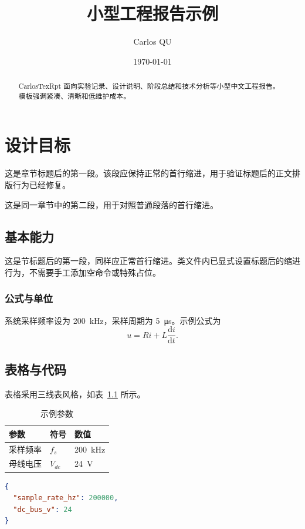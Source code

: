 \documentclass{CarlosTexRpt}
\title{小型工程报告示例}
\author{Carlos QU}
\date{\today}
\begin{document}
\maketitle

\begin{abstract}
CarlosTexRpt 面向实验记录、设计说明、阶段总结和技术分析等小型中文工程报告。模板强调紧凑、清晰和低维护成本。
\end{abstract}

\tableofcontents

\chapter{设计目标}
这是章节标题后的第一段。该段应保持正常的首行缩进，用于验证标题后的正文排版行为已经修复。

这是同一章节中的第二段，用于对照普通段落的首行缩进。

\section{基本能力}
这是节标题后的第一段，同样应正常首行缩进。类文件内已显式设置标题后的缩进行为，不需要手工添加空命令或特殊占位。

\subsection{公式与单位}
系统采样频率设为 \SI{200}{\kilo\hertz}，采样周期为 \SI{5}{\micro\second}。示例公式为
\begin{equation}
  u = Ri + L\frac{\mathrm{d}i}{\mathrm{d}t}.
\end{equation}

\section{表格与代码}
表格采用三线表风格，如表~\ref{tab:params} 所示。

\begin{table}[H]
  \centering
  \caption{示例参数}
  \label{tab:params}
  \begin{tabular}{lll}
    \toprule
    参数 & 符号 & 数值 \\
    \midrule
    采样频率 & $f_s$ & \SI{200}{\kilo\hertz} \\
    母线电压 & $V_{dc}$ & \SI{24}{\volt} \\
    \bottomrule
  \end{tabular}
\end{table}

\begin{lstlisting}[language=json,caption={示例配置}]
{
  "sample_rate_hz": 200000,
  "dc_bus_v": 24
}
\end{lstlisting}
\end{document}
